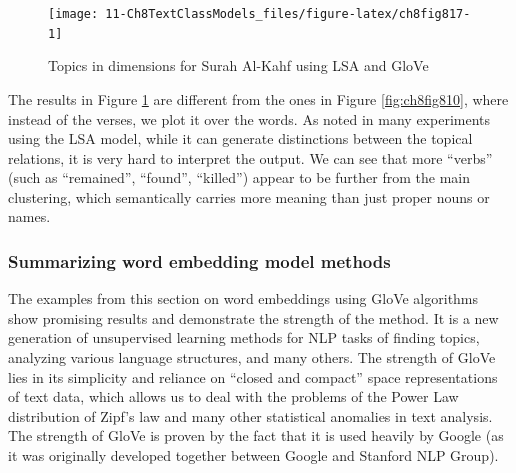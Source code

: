 \documentclass[
]{article}
\newenvironment{Shaded}{\begin{snugshade}}{\end{snugshade}}
\newcommand{\AttributeTok}[1]{\textcolor[rgb]{0.13,0.29,0.53}{#1}}
\newcommand{\DecValTok}[1]{\textcolor[rgb]{0.00,0.00,0.81}{#1}}
\newcommand{\FloatTok}[1]{\textcolor[rgb]{0.00,0.00,0.81}{#1}}
\newcommand{\FunctionTok}[1]{\textcolor[rgb]{0.13,0.29,0.53}{\textbf{#1}}}
\newcommand{\NormalTok}[1]{#1}
\newcommand{\OtherTok}[1]{\textcolor[rgb]{0.56,0.35,0.01}{#1}}
\newcommand{\SpecialCharTok}[1]{\textcolor[rgb]{0.81,0.36,0.00}{\textbf{#1}}}
\begin{document}
\begin{Shaded}
\end{Shaded}

\begin{figure}

{\centering \texttt{[image: 11-Ch8TextClassModels\_files/figure-latex/ch8fig817-1]} 

}

\caption{Topics in dimensions for Surah Al-Kahf using LSA and GloVe}\label{fig:ch8fig817}
\end{figure}

The results in Figure \ref{fig:ch8fig817} are different from the ones in Figure \ref{fig:ch8fig810}, where instead of the verses, we plot it over the words. As noted in many experiments using the LSA model, while it can generate distinctions between the topical relations, it is very hard to interpret the output. We can see that more ``verbs'' (such as ``remained'', ``found'', ``killed'') appear to be further from the main clustering, which semantically carries more meaning than just proper nouns or names.

\hypertarget{summarizing-word-embedding-model-methods}{%
\subsubsection{Summarizing word embedding model methods}\label{summarizing-word-embedding-model-methods}}

The examples from this section on word embeddings using GloVe algorithms show promising results and demonstrate the strength of the method. It is a new generation of unsupervised learning methods for NLP tasks of finding topics, analyzing various language structures, and many others. The strength of GloVe lies in its simplicity and reliance on ``closed and compact'' space representations of text data, which allows us to deal with the problems of the Power Law distribution of Zipf's law and many other statistical anomalies in text analysis. The strength of GloVe is proven by the fact that it is used heavily by Google (as it was originally developed together between Google and Stanford NLP Group).
\end{document}

